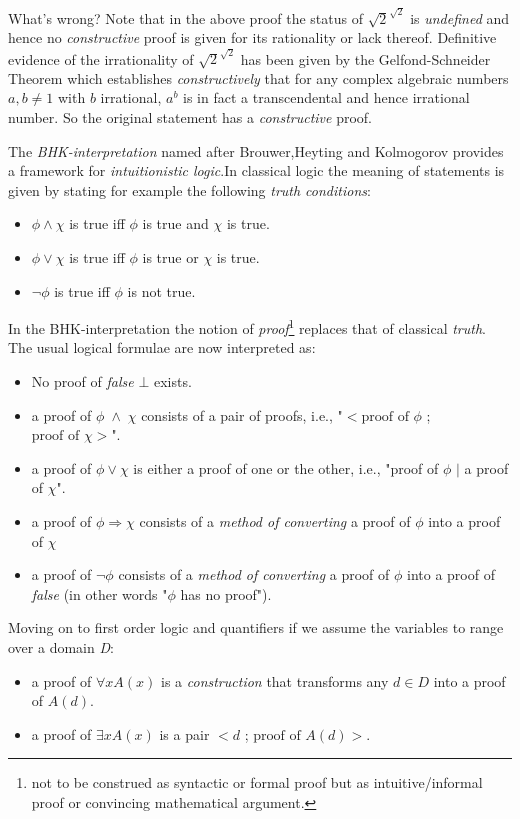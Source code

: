  What's wrong? \newline
	Note that in the above proof the status of $\sqrt{2}^{\sqrt{2}}$ is \emph{undefined} and hence no \emph{constructive} proof is given for its rationality or lack thereof. \newline
	Definitive evidence of the irrationality of $\sqrt{2}^{\sqrt{2}}$ has been given by the Gelfond-Schneider Theorem which establishes \emph{constructively} that for any complex algebraic numbers $a,b \neq 1$ with $b$ irrational, $a^b$ is in fact a transcendental and hence irrational number. So the original statement has a \emph{constructive} proof.\newline 

	The \emph{BHK-interpretation} named after Brouwer,Heyting and Kolmogorov provides a framework for \emph{intuitionistic logic}.\newline In classical logic the meaning of statements is given by stating for example the following \emph{truth conditions}: 
	\begin{itemize}
		\item $\phi \land \chi$ is true iff $\phi$ is true and $\chi$ is true.
		\item $\phi \lor \chi$ is true iff $\phi$ is true or $\chi$ is true.
		\item $\neg \phi$ is true iff $\phi$ is not true.
	\end{itemize}
	In the BHK-interpretation the notion of \emph{proof}\footnote{not to be construed as syntactic or formal proof but as intuitive/informal proof or convincing mathematical argument.} replaces that of classical \emph{truth}.
	The usual logical formulae are now interpreted as:
	\begin{itemize}
		\item No proof of \emph{false} $\bot$ exists. 
		\item a proof of $\phi \;\land\; \chi$ consists of a pair of proofs, i.e., \newline   "$< \text{proof of } \phi$ ; $\text{proof of } \chi >$".
		\item a proof of $\phi \lor \chi$ is either a proof of one or the other, i.e., \newline  "proof of $\phi$ $|$ a proof of $ \chi $".
		\item a proof of $\phi \Rightarrow \chi $ consists of a \emph{method of converting} a proof of $\phi$ into a proof of $\chi$
		\item a proof of $\neg \phi$ consists of a \emph{method of converting} a proof of $\phi$ into a proof of \emph{false} (in other words "$\phi$ has no proof").
	\end{itemize}
	Moving on to first order logic and quantifiers if we assume the variables to range over a domain \emph{D}:
	\begin{itemize}
		\item a proof of $\forall x A(x)$ is a \emph{construction} that transforms any $d \in D$ into a proof of $A(d)$.
		\item a proof of $\exists x A(x)$ is a pair $<d$ ; $\text{proof of } A(d) >$.
	\end{itemize}
	
